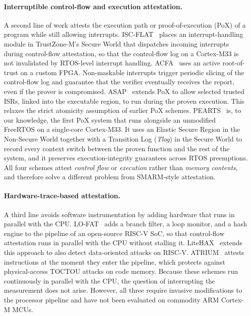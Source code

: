 \documentclass{ieeeaccess}
\begin{document}
{\paragraph{Interruptible control-flow and execution
attestation.}
A second line of work attests the execution path or
proof-of-execution (PoX) of a program while still allowing
interrupts.
ISC-FLAT~\cite{iscflat} places an interrupt-handling
module in TrustZone-M's Secure World that dispatches
incoming interrupts during control-flow attestation, so
that the control-flow log on a Cortex-M33 is not
invalidated by RTOS-level interrupt handling.
ACFA~\cite{acfa} uses an active root-of-trust on a custom
FPGA. Non-maskable interrupts trigger periodic slicing of
the control-flow log and guarantee that the verifier
eventually receives the report, even if the prover is
compromised.
ASAP~\cite{asap} extends PoX to allow selected trusted
ISRs, linked into the executable region, to run during the
proven execution. This relaxes the strict atomicity
assumption of earlier PoX schemes.
PEARTS~\cite{pearts} is, to our knowledge, the first PoX
system that runs alongside an unmodified FreeRTOS on a
single-core Cortex-M33. It uses an Elastic Secure Region
in the Non-Secure World together with a Transition Log
(\textit{Tlog}) in the Secure World to record every
context switch between the proven function and the rest
of the system, and it preserves execution-integrity
guarantees across RTOS preemptions.
All four schemes attest \emph{control flow} or
\emph{execution} rather than \emph{memory contents}, and
therefore solve a different problem from SMARM-style
attestation.

\paragraph{Hardware-trace-based attestation.}
A third line avoids software instrumentation by adding
hardware that runs in parallel with the CPU.
LO-FAT~\cite{lofat} adds a branch filter, a loop monitor,
and a hash engine to the pipeline of an open-source
RISC-V SoC, so that control-flow attestation runs in
parallel with the CPU without stalling it.
LiteHAX~\cite{litehax} extends this approach to also
detect data-oriented attacks on RISC-V.
ATRIUM~\cite{atrium} attests instructions at the moment
they enter the pipeline, which protects against
physical-access TOCTOU attacks on code memory.
Because these schemes run continuously in parallel with
the CPU, the question of interrupting the measurement does
not arise. However, all three require invasive
modifications to the processor pipeline and have not been
evaluated on commodity ARM Cortex-M MCUs.

}
\end{document}
